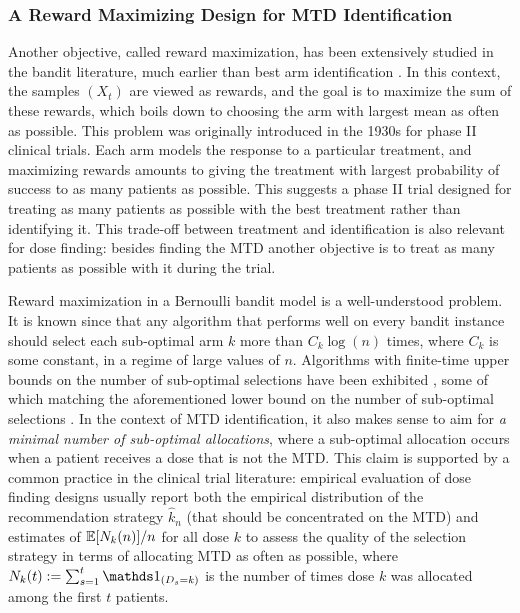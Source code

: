 \subsubsection{A Reward Maximizing Design for MTD Identification}

Another objective, called reward maximization, has been extensively studied in the bandit literature, much earlier than best arm identification \cite{Thompson33,Robbins52,LaiRobbins85bandits}. In this context, the samples $(X_t)$ are viewed as rewards, and the goal is to maximize the sum of these rewards, which boils down to choosing the arm with largest mean as often as possible. This problem was originally introduced in the 1930s for phase II clinical trials. Each arm models the response to a particular treatment, and maximizing rewards amounts to giving the treatment with largest probability of success to as many patients as possible. This suggests a phase II trial designed for treating as many patients as possible with the best treatment rather than identifying it. This trade-off between treatment and identification is also relevant for dose finding: besides finding the MTD another objective is to treat as many patients as possible with it during the trial.

Reward maximization in a Bernoulli bandit model is a well-understood problem. It is known since \cite{LaiRobbins85bandits} that any algorithm that performs well on every bandit instance should select each sub-optimal arm $k$ more than $C_k\log(n)$ times, where $C_k$ is some constant, in a regime of large values of $n$. Algorithms with finite-time upper bounds on the number of sub-optimal selections have been exhibited \cite{Aueral02}, some of which matching the aforementioned lower bound on the number of sub-optimal selections \cite{KLUCBJournal}. In the context of MTD identification, it also makes sense to aim for \emph{a minimal number of sub-optimal allocations}, where a sub-optimal allocation occurs when a patient receives a dose that is not the MTD. This claim is supported by a common practice in the clinical trial literature: empirical evaluation of dose finding designs usually report both the empirical distribution of the recommendation strategy $\hat{k}_n$ (that should be concentrated on the MTD) and estimates of $\mathbb{E}[N_k(n)]/n$ for all dose $k$ to assess the quality of the selection strategy in terms of allocating MTD as often as possible, where $N_k(t) := \sum_{s=1}^t \ind_{(D_s = k)}$ is the number of times dose $k$ was allocated among the first $t$ patients.




